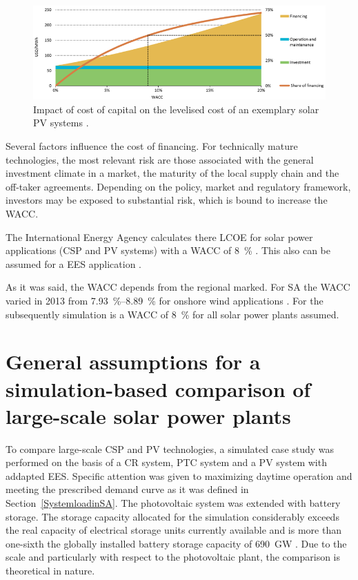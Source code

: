 \begin{figure}[htbp]  
\centering
\includegraphics[width=1\linewidth]{FIG/WACC}
\caption[Impact of cost of capital on the levelised cost of an exemplary solar PV systems.]{Impact of cost of capital on the levelised cost of an exemplary solar PV systems \cite{IEA2015}.}\label{WACC}
\end{figure}
Several factors influence the cost of financing. For technically mature technologies, the most relevant risk are those associated with the general investment climate in a market, the maturity of the local supply chain and the off-taker agreements. Depending on the policy, market and regulatory framework, investors may be exposed to substantial risk, which is bound to increase the WACC. \cite{IEA2014c} 

The International Energy Agency calculates there LCOE for solar power applications (CSP and PV systems) with a WACC of \SI{8}{\percent} \cite{IEA2014c}. This also can be assumed for a EES application \cite{Zakeri2015}.

As it was said, the WACC depends from the regional marked. For SA the WACC varied in 2013 from \SIrange{7.93}{8.89}{\percent} for onshore wind applications \cite{IEA2015}. For the subsequently simulation is a WACC of \SI{8}{\percent} for all solar power plants assumed.

\pagebreak
\section{General assumptions for a simulation-based comparison of large-scale solar power plants}
To compare large-scale CSP and PV technologies, a simulated case study was performed on the basis of a CR system, PTC system and a PV system with addapted EES. Specific attention was given to maximizing daytime operation and meeting the prescribed demand curve as it was defined in Section~\ref{SystemloadinSA}. The photovoltaic system was extended with battery storage. The storage capacity allocated for the simulation considerably exceeds the real capacity of electrical storage units currently available and is more than one-sixth the globally installed battery storage capacity of \SI{690}{GW} \cite{IEA2015}. Due to the scale and particularly with respect to the photovoltaic plant, the comparison is theoretical in nature.

